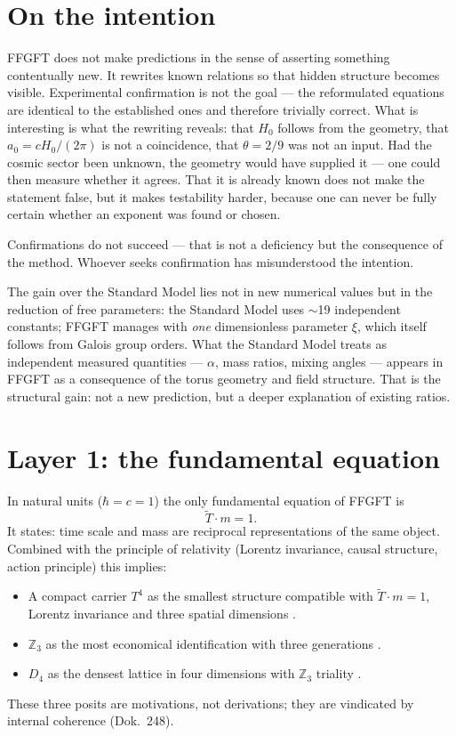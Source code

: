 \section*{On the intention}

FFGFT does not make predictions in the sense of asserting something
contentually new. It rewrites known relations so that hidden structure becomes
visible. Experimental confirmation is not the goal --- the reformulated equations
are identical to the established ones and therefore trivially correct. What is
interesting is what the rewriting reveals: that $H_0$ follows from the geometry,
that $a_0=cH_0/(2\pi)$ is not a coincidence, that $\theta=2/9$ was not an input.
Had the cosmic sector been unknown, the geometry would have supplied it --- one
could then measure whether it agrees. That it is already known does not make the
statement false, but it makes testability harder, because one can never be fully
certain whether an exponent was found or chosen.

Confirmations do not succeed --- that is not a deficiency but the consequence of
the method. Whoever seeks confirmation has misunderstood the intention.

The gain over the Standard Model lies not in new numerical values but in the
reduction of free parameters: the Standard Model uses $\sim$19 independent
constants; FFGFT manages with \emph{one} dimensionless parameter $\xi$, which
itself follows from Galois group orders. What the Standard Model treats as
independent measured quantities --- $\alpha$, mass ratios, mixing angles ---
appears in FFGFT as a consequence of the torus geometry and field structure.
That is the structural gain: not a new prediction, but a deeper explanation
of existing ratios.

\section{Layer 1: the fundamental equation}

In natural units ($\hbar=c=1$) the only fundamental equation of FFGFT is
\[
  \tilde{T} \cdot m = 1 .
\]
It states: time scale and mass are reciprocal representations of the same object.
Combined with the principle of relativity (Lorentz invariance, causal structure,
action principle) this implies:
\begin{itemize}[nosep]
\item A compact carrier $T^4$ as the smallest structure compatible with
      $\tilde{T}\cdot m=1$, Lorentz invariance and three spatial dimensions \SetzM.
\item $\mathbb{Z}_3$ as the most economical identification with three generations \SetzM.
\item $D_4$ as the densest lattice in four dimensions with $\mathbb{Z}_3$ triality \SetzM.
\end{itemize}
These three posits are motivations, not derivations; they are vindicated by
internal coherence (Dok.~248).

